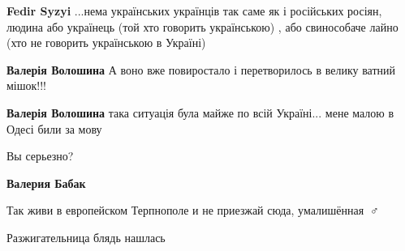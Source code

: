 \begin{itemize}
\begin{itemize}
\begin{itemize}
 
\textbf{Fedir Syzyi} ...нема українських українців так саме як і російських
росіян, людина або українець (той хто говорить українською) , або свинособаче
лайно (хто не говорить українською в Україні)
\end{itemize}

 
\textbf{Валерія Волошина}
А воно вже повиростало і перетворилось в велику ватний мішок!!!

 
\textbf{Валерія Волошина} така ситуація була майже по всій Україні... мене малою в Одесі били за мову

 
Вы серьезно?

 
\textbf{Валерия Бабак} 

Так живи в европейском Терпнополе и не приезжай сюда, умалишённая🤦🏻♂️🤣🤣🤣

Разжигательница блядь нашлась\Laughey[1.0][white]🤣

\begin{itemize}
 

\end{itemize}
\end{itemize}
\end{itemize}
